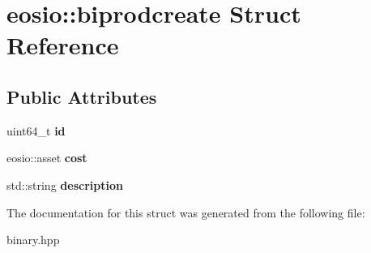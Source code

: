 \hypertarget{structeosio_1_1biprodcreate}{}\section{eosio\+:\+:biprodcreate Struct Reference}
\label{structeosio_1_1biprodcreate}
\subsection*{Public Attributes}
\begin{DoxyCompactItemize}
\item 
\mbox{\label{structeosio_1_1biprodcreate_a03c760f3ba5f2e17c91f1427a39c7309}} 
uint64\+\_\+t {\bfseries id}
\item 
\mbox{\label{structeosio_1_1biprodcreate_a5e6904b5e302c37eddb882024a641bf9}} 
eosio\+::asset {\bfseries cost}
\item 
\mbox{\label{structeosio_1_1biprodcreate_a04bfe07417c95ff83be395f369057f0d}} 
std\+::string {\bfseries description}
\end{DoxyCompactItemize}


The documentation for this struct was generated from the following file\+:\begin{DoxyCompactItemize}
\item 
binary.\+hpp\end{DoxyCompactItemize}
